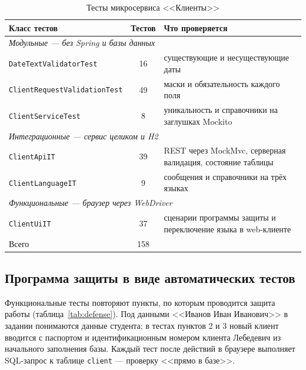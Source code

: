 \documentclass[14pt,a4paper]{extarticle}
\begin{document}
\begin{table}[H]
\caption{Тесты микросервиса <<Клиенты>>}
\label{tab:tests}
\centering
\small
\begin{tabularx}{\textwidth}{lcX}
\toprule
Класс тестов & Тестов & Что проверяется \\
\midrule
\multicolumn{3}{l}{\textit{Модульные --- без Spring и базы данных}} \\
\texttt{DateTextValidatorTest} & 16 & существующие и несуществующие даты \\
\texttt{ClientRequestValidationTest} & 49 & маски и обязательность каждого поля \\
\texttt{ClientServiceTest} & 8 & уникальность и справочники на заглушках Mockito \\
\midrule
\multicolumn{3}{l}{\textit{Интеграционные --- сервис целиком и H2}} \\
\texttt{ClientApiIT} & 39 & REST через MockMvc, серверная валидация, состояние таблицы \\
\texttt{ClientLanguageIT} & 9 & сообщения и справочники на трёх языках \\
\midrule
\multicolumn{3}{l}{\textit{Функциональные --- браузер через WebDriver}} \\
\texttt{ClientUiIT} & 37 & сценарии программы защиты и переключение языка в web-клиенте \\
\midrule
Всего & 158 & \\
\bottomrule
\end{tabularx}
\end{table}

\subsection{Программа защиты в виде автоматических тестов}

Функциональные тесты повторяют пункты, по которым проводится защита работы
(таблица~\ref{tab:defense}). Под данными <<Иванов Иван Иванович>> в задании понимаются данные
студента; в тестах пунктов 2 и 3 новый клиент вводится с паспортом и идентификационным
номером клиента Лебедевич из начального заполнения базы. Каждый тест после действий в
браузере выполняет SQL-запрос к таблице \texttt{client} --- проверку <<прямо в базе>>.
\end{document}
